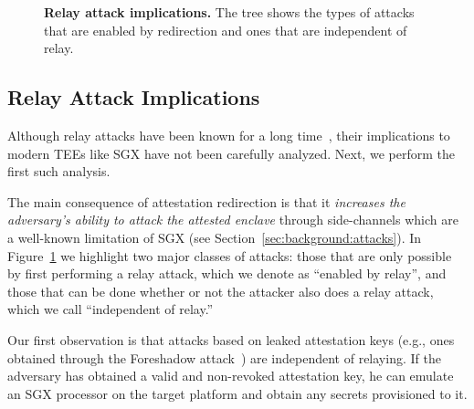 \begin{figure}[t]
    
    \caption{\textbf{Relay attack implications.} The tree shows the types of attacks that are enabled by  redirection and ones that are independent of relay.}
    \figsaverL
    \label{fig:relayTree}
\end{figure}

            
\subsection{Relay Attack Implications}
\label{sec:problemStatement:implication}

Although relay attacks have been known for a long time~\cite{parno2008bootstrapping}, their implications to modern TEEs like SGX have not been carefully analyzed. Next, we perform the first such analysis.

The main consequence of attestation redirection is that it \emph{increases the adversary's ability to attack the attested enclave} through side-channels which are a well-known limitation of SGX (see Section~\ref{sec:background:attacks}). In Figure~\ref{fig:relayTree} we highlight two major classes of attacks: those that are only possible by first performing a relay attack, which we denote as ``enabled by relay'', and those that can be done whether or not the attacker also does a relay attack, which we call ``independent of relay.''

\parasaver
{} Our first observation is that attacks based on leaked attestation keys (e.g., ones obtained through the Foreshadow attack~\cite{foreshadow-usenix18}) are independent of relaying. If the adversary has obtained a valid and non-revoked attestation key, he can emulate an SGX processor on the target platform and obtain any secrets provisioned to it.

